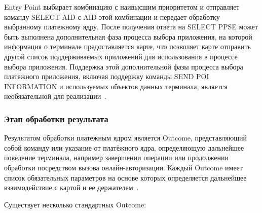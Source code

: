 Entry Point выбирает комбинацию с наивысшим приоритетом и отправляет команду SELECT AID с AID этой комбинации и передает обработку выбранному платежному ядру.
После получения ответа на SELECT PPSE может быть выполнена дополнительная фаза процесса выбора приложения, на которой информация о терминале предоставляется карте, что позволяет карте отправить другой список поддерживаемых приложений для использования в процессе выбора приложения.
Поддержка этой дополнительной фазы процесса выбора платежного приложения, включая поддержку команды SEND POI INFORMATION и используемых объектов данных терминала, является необязательной для реализации~\cite{emv_book_B}.

\subsubsection{Этап обработки результата}
\label{subsubsec:outcome_processing}

Результатом обработки платежным ядром является Outcome, представляющий собой команду или указание от платёжного ядра, определяющую дальнейшее поведение терминала, например завершении операции или продолжении обработки посредством вызова онлайн-авторизации.
Каждый Outcome имеет список обязательных параметров на основе которых определяется дальнейшее взаимодействие с картой и ее держателем~\cite{emv_book_A}.

Существует несколько стандартных Outcome:

